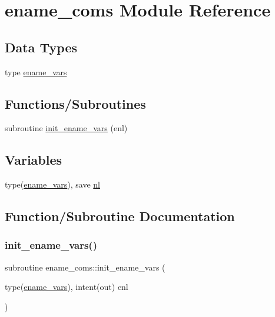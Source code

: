 \hypertarget{namespaceename__coms}{}\section{ename\+\_\+coms Module Reference}
\label{namespaceename__coms}
\subsection*{Data Types}
\begin{DoxyCompactItemize}
\item 
type \hyperlink{structename__coms_1_1ename__vars}{ename\+\_\+vars}
\end{DoxyCompactItemize}
\subsection*{Functions/\+Subroutines}
\begin{DoxyCompactItemize}
\item 
subroutine \hyperlink{namespaceename__coms_af7ad337997a039b5535379ab67b5f371}{init\+\_\+ename\+\_\+vars} (enl)
\end{DoxyCompactItemize}
\subsection*{Variables}
\begin{DoxyCompactItemize}
\item 
type(\hyperlink{structename__coms_1_1ename__vars}{ename\+\_\+vars}), save \hyperlink{namespaceename__coms_a87d8817dfc69ff263d0afc7954d7dbc0}{nl}
\end{DoxyCompactItemize}


\subsection{Function/\+Subroutine Documentation}
\mbox{\label{namespaceename__coms_af7ad337997a039b5535379ab67b5f371}} 
\subsubsection{\texorpdfstring{init\+\_\+ename\+\_\+vars()}{init\_ename\_vars()}}
{\footnotesize\ttfamily subroutine ename\+\_\+coms\+::init\+\_\+ename\+\_\+vars (\begin{DoxyParamCaption}\item[{type(\hyperlink{structename__coms_1_1ename__vars}{ename\+\_\+vars}), intent(out)}]{enl }\end{DoxyParamCaption})}



